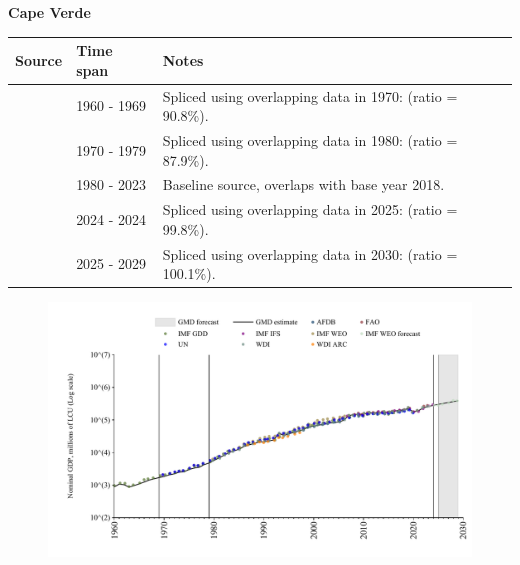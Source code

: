 \documentclass[12pt,a4paper,landscape]{article}
\begin{document}
\begin{adjustbox}{max totalsize={\paperwidth}{\paperheight},center}
\begin{minipage}[t][\textheight][t]{\textwidth}
\vspace*{0.5cm}
{}
\begin{center}
{\Large\bfseries Cape Verde}
\end{center}
\vspace{0.5cm}
\begin{table}[H]
\centering
\small
\begin{tabular}{|l|l|l|}
\hline
\textbf{Source} & \textbf{Time span} & \textbf{Notes} \\
\hline
\rowcolor{white}\cite{IMF_GDD}& 1960 - 1969 &Spliced using overlapping data in 1970: (ratio = 90.8\%).\\
\rowcolor{lightgray}\cite{UN}& 1970 - 1979 &Spliced using overlapping data in 1980: (ratio = 87.9\%).\\
\rowcolor{white}\cite{WDI}& 1980 - 2023 &Baseline source, overlaps with base year 2018.\\
\rowcolor{lightgray}\cite{IMF_IFS}& 2024 - 2024 &Spliced using overlapping data in 2025: (ratio = 99.8\%).\\
\rowcolor{white}\cite{IMF_WEO_forecast}& 2025 - 2029 &Spliced using overlapping data in 2030: (ratio = 100.1\%).\\
\hline
\end{tabular}
\end{table}
\begin{figure}[H]
\centering
\includegraphics[width=\textwidth,height=0.6\textheight,keepaspectratio]{graphs/CPV_nGDP.pdf}
\end{figure}
\end{minipage}
\end{adjustbox}
\end{document}
